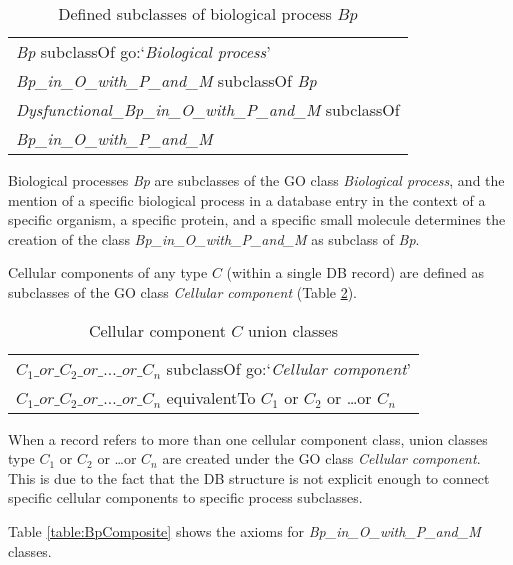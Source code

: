 \begin{table}[H]
	\caption{Defined subclasses of biological process $Bp$}
	\label{table:Bp}
	\centering
	\begin{tabular}{p{3in}}
		\hline
			\textit{Bp} subclassOf go:`\textit{Biological process}' \\
			\textit{\textit{Bp}\_in\_O\_with\_P\_and\_M} subclassOf \textit{Bp} \\
			\textit{Dysfunctional\_Bp\_in\_O\_with\_P\_and\_M} subclassOf  \\
			\hspace{1cm} \textit{Bp\_in\_O\_with\_P\_and\_M} \\
		\hline
	\end{tabular}
\end{table}%

\noindent
Biological processes \textit{Bp} are subclasses of the GO class \textit{Biological process}, and the mention of a specific biological process in a database entry in the context of a specific organism, a specific protein, and a specific small molecule determines the creation of the class \textit{Bp\_in\_O\_with\_P\_and\_M} as subclass of \textit{Bp}.

Cellular components of any type $C$ (within a single DB record) are defined as subclasses of the GO class \textit{Cellular component} (Table \ref{table:CellCompC}).

\begin{table}[H]
	\caption{Cellular component $C$ union classes}
	\label{table:CellCompC}
	\centering
	\begin{tabular}{p{3in}}
		\hline
		\textit{$C_1\_or\_C_2\_or\_\ldots\_or\_C_n$} subclassOf go:`\textit{Cellular component}' \\
		{$C_1\_or\_C_2\_or\_\ldots\_or\_C_n$} equivalentTo $C_1$ or $C_2$ or \ldots or $C_n$ \\
		\hline
	\end{tabular}
\end{table}%
\noindent
 When a record refers to more than one cellular component class, union classes type $C_1$ or $C_2$ or \ldots or $C_n$ are created under the GO class \textit{Cellular component}. This is due to the fact that the DB structure is not explicit enough to connect specific cellular components to specific process subclasses.

Table \ref{table:BpComposite} shows the axioms for \textit{Bp\_in\_O\_with\_P\_and\_M} classes.

